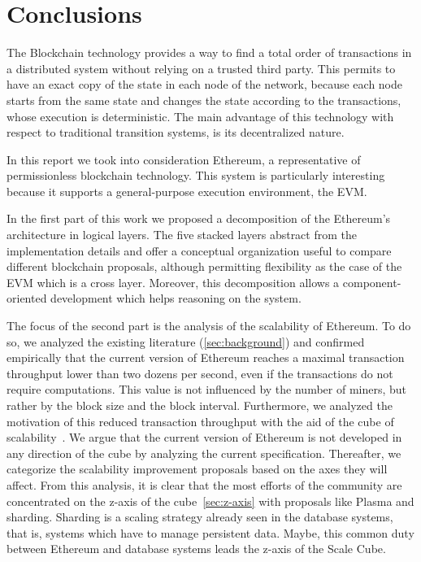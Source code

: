 \section{Conclusions}
\label{sec:conclusions}
The Blockchain technology provides a way to find a total order of transactions
in a distributed system without relying on a trusted third party. This permits
to have an exact copy of the state in each node of the network, because each
node starts from the same state and changes the state according to the
transactions, whose execution is deterministic. The main advantage of this
technology with respect to traditional transition systems, is its decentralized
nature.

In this report we took into consideration Ethereum, a representative of
permissionless blockchain technology. This system is particularly interesting
because it supports a general-purpose execution environment, the EVM.

In the first part of this work we proposed a decomposition of the Ethereum's
architecture in logical layers. The five stacked layers abstract from the
implementation details and offer a conceptual organization useful to compare
different blockchain proposals, although permitting flexibility as the case of
the EVM which is a cross layer. Moreover, this decomposition allows a
component-oriented development which helps reasoning on the system.

The focus of the second part is the analysis of the scalability of Ethereum. To
do so, we analyzed the existing literature (\autoref{sec:background}) and
confirmed empirically that the current version of Ethereum reaches a maximal
transaction throughput lower than two dozens per second, even if the
transactions do not require computations. This value is not influenced by the
number of miners, but rather by the block size and the block interval.
Furthermore, we analyzed the motivation of this reduced transaction throughput
with the aid of the cube of scalability~\cite{bib:art-of-scalability}. We argue
that the current version of Ethereum is not developed in any direction of the
cube by analyzing the current specification. Thereafter, we categorize the
scalability improvement proposals based on the axes they will affect. From this
analysis, it is clear that the most efforts of the community are concentrated
on the z-axis of the cube~\autoref{sec:z-axis} with proposals like Plasma and
sharding. Sharding is a scaling strategy already seen in the database systems,
that is, systems which have to manage persistent data. Maybe, this common duty
between Ethereum and database systems leads the z-axis of the Scale Cube.
